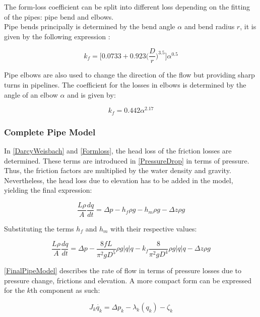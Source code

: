 The form-loss coefficient can be split into different loss depending on the 
fitting of the pipes: pipe bend and elbows. 
\\
Pipe bends principally is determined by the 
bend angle $\alpha$ and bend radius $r$, it is given by the following 
expression \cite{Design_Water}: 

\begin{equation}
  k_f = \bigg[0.0733 + 0.923 \bigg(\frac{D}{r}\bigg)^{3.5}\bigg]\alpha^{0.5}
\end{equation}

Pipe elbows are also used to change the direction of the flow but providing 
sharp turns in pipelines. The coefficient for the losses in elbows is determined by the angle of an elbow $\alpha$ and is given by:

\begin{equation}
  k_f = 0.442\alpha^{2.17}
\end{equation}

\subsubsection{Complete Pipe Model}
In \eqref{DarcyWeisbach} and \eqref{Formloss}, the head loss of the friction losses are determined. These terms are introduced in \eqref{PressureDrop} in terms of pressure. Thus, the friction factors are multiplied by the water density and gravity. Nevertheless, the head loss due to elevation has to be added in the model, yielding the final expression:

\begin{equation}
   \frac{L \rho}{A} \frac{dq}{dt} =\Delta p - h_f \rho g - h_m \rho g - \Delta z \rho 
   g
\end{equation}

Substituting the terms $h_f$ and $h_m$ with their respective values:

\begin{equation}
\label{FinalPipeModel}
   \frac{L \rho}{A} \frac{dq}{dt} =\Delta p - \frac{8fL}{\pi^{2}gD^5} \rho g  |q| q - k_f \frac{8}{\pi^2gD^4} \rho g |q| q - \Delta z \rho g 
\end{equation}

\eqref{FinalPipeModel} describes the rate of flow in terms of pressure losses due to pressure change, frictions and elevation. A more compact form can be expressed for the $k$th component as such:

\begin{equation}
\label{FinalPipeModelCompact}
   J_k \dot{q_k} = \Delta p_k - \lambda_k(q_k) - \zeta_k 
\end{equation}


